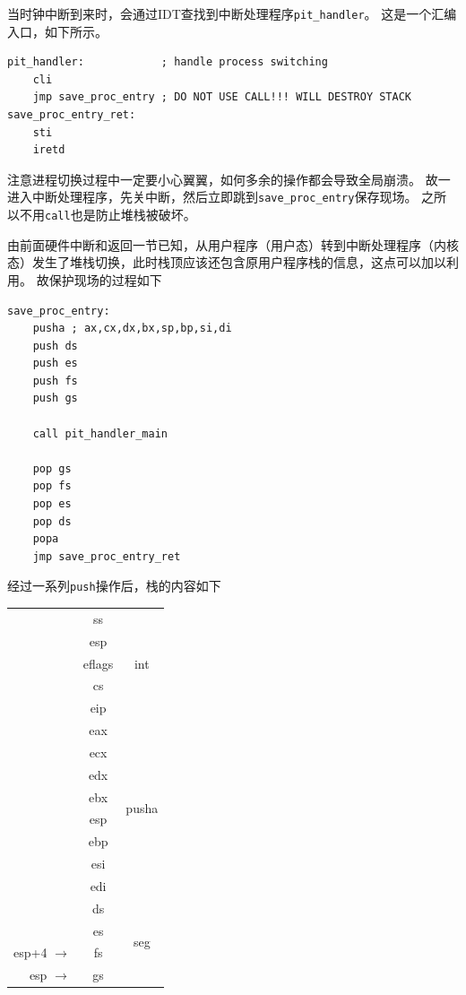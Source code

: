 \documentclass[logo,reportComp]{thesis}
\begin{document}
当时钟中断到来时，会通过IDT查找到中断处理程序\verb'pit_handler'。
这是一个汇编入口，如下所示。
\begin{lstlisting}[language={[x86masm]Assembler}]
pit_handler:            ; handle process switching
	cli
	jmp save_proc_entry ; DO NOT USE CALL!!! WILL DESTROY STACK
save_proc_entry_ret:
	sti
	iretd
\end{lstlisting}

注意进程切换过程中一定要小心翼翼，如何多余的操作都会导致全局崩溃。
故一进入中断处理程序，先关中断，然后立即跳到\verb'save_proc_entry'保存现场。
之所以不用\verb'call'也是防止堆栈被破坏。

由前面硬件中断和返回一节已知，从用户程序（用户态）转到中断处理程序（内核态）发生了堆栈切换，此时栈顶应该还包含原用户程序栈的信息，这点可以加以利用。
故保护现场的过程如下
\begin{lstlisting}[language={[x86masm]Assembler}]
save_proc_entry:
	pusha ; ax,cx,dx,bx,sp,bp,si,di
	push ds
	push es
	push fs
	push gs

	call pit_handler_main

	pop gs
	pop fs
	pop es
	pop ds
	popa
	jmp save_proc_entry_ret
\end{lstlisting}

经过一系列\verb'push'操作后，栈的内容如下
\begin{center}
\begin{tabular}{r|c|c|}\cline{2-3}
 & ss      & \multirow{5}{*}{int}\\\cline{2-2}
 & esp     & \\\cline{2-2}
 & eflags  & \\\cline{2-2}
 & cs      & \\\cline{2-2}
 & eip     & \\\cline{2-3}
 & eax     & \multirow{8}{*}{pusha}\\\cline{2-2}
 & ecx     & \\\cline{2-2}
 & edx     & \\\cline{2-2}
 & ebx     & \\\cline{2-2}
 & esp     & \\\cline{2-2}
 & ebp     & \\\cline{2-2}
 & esi     & \\\cline{2-2}
 & edi     & \\\cline{2-3}
 & ds      & \multirow{4}{*}{seg}\\\cline{2-2}
 & es      & \\\cline{2-2}
 esp+4 $\to$ & fs      & \\\cline{2-2}
 esp $\to$ & gs      & \\\cline{2-3}
\end{tabular}
\end{center}
\end{document}
